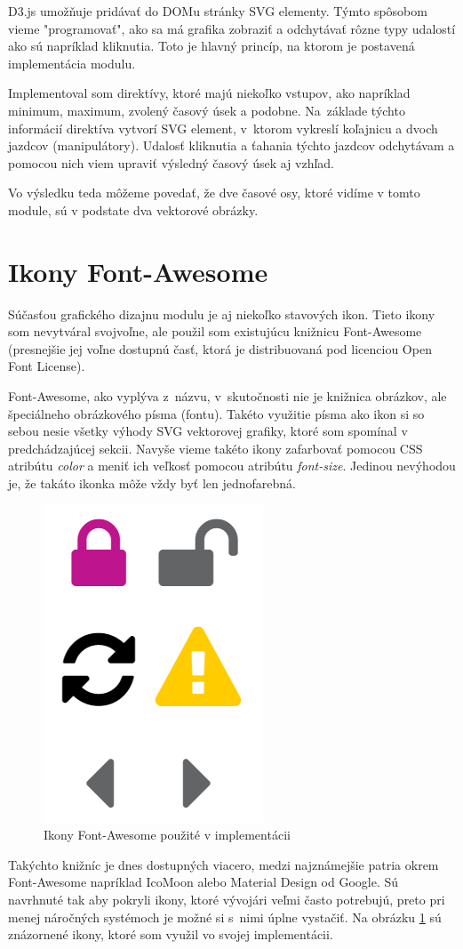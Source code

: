 \documentclass[
  digital, %
  twoside, %
  notable,   %
  nolof,   %
  nolot,   %
]{fithesis3}
\newcommand{\inquotes}[1]{{}"{}#1{}"{}}
\begin{document}
D3.js umožňuje pridávať do DOMu stránky SVG elementy. Týmto spôsobom vieme \inquotes{programovať}, ako sa má grafika zobraziť a odchytávať rôzne typy udalostí ako sú napríklad kliknutia. Toto je hlavný princíp, na ktorom je postavená implementácia modulu.

Implementoval som direktívy, ktoré majú niekoľko vstupov, ako napríklad minimum, maximum, zvolený časový úsek a podobne. Na~základe týchto informácií direktíva vytvorí SVG element, v~ktorom vykreslí koľajnicu a dvoch jazdcov (manipulátory). Udalosť kliknutia a ťahania týchto jazdcov odchytávam a pomocou nich viem upraviť výsledný časový úsek aj vzhľad.

Vo výsledku teda môžeme povedať, že dve časové osy, ktoré vidíme v tomto module, sú v podstate dva vektorové obrázky.

\section{Ikony Font-Awesome}
Súčasťou grafického dizajnu modulu je aj niekoľko stavových ikon. Tieto ikony som nevytváral svojvoľne, ale použil som existujúcu knižnicu Font-Awesome (presnejšie jej voľne dostupnú časť, ktorá je distribuovaná pod licenciou Open Font License).

Font-Awesome, ako vyplýva z~názvu, v~skutočnosti nie je knižnica obrázkov, ale špeciálneho obrázkového písma (fontu). Takéto využitie písma ako ikon si so sebou nesie všetky výhody SVG vektorovej grafiky, ktoré som spomínal v predchádzajúcej sekcii. Navyše vieme takéto ikony zafarbovať pomocou CSS atribútu \textit{color} a meniť ich veľkosť pomocou atribútu \textit{font-size}. Jedinou nevýhodou je, že takáto ikonka môže vždy byť len jednofarebná.

\begin{figure}
	\center
	\includegraphics[width=.25\linewidth]{icons}
	\caption{Ikony Font-Awesome použité v implementácii}
	\label{icons}
\end{figure}

Takýchto knižníc je dnes dostupných viacero, medzi najznámejšie patria okrem Font-Awesome napríklad IcoMoon alebo Material Design od Google. Sú navrhnuté tak aby pokryli ikony, ktoré vývojári veľmi často potrebujú, preto pri menej náročných systémoch je možné si s~nimi úplne vystačiť. Na obrázku \ref{icons} sú znázornené ikony, ktoré som využil vo svojej implementácii.
\end{document}

